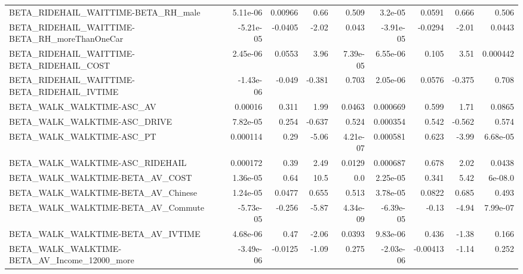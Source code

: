\begin{tabular}{lrrrrrrrr}
BETA\_RIDEHAIL\_WAITTIME-BETA\_RH\_male                &    5.11e-06 &      0.00966 &     0.66 &    0.509 &    3.2e-05 &      0.0591 &        0.666 &         0.506 \\
BETA\_RIDEHAIL\_WAITTIME-BETA\_RH\_moreThanOneCar      &   -5.21e-05 &      -0.0405 &    -2.02 &    0.043 &  -3.91e-05 &     -0.0294 &        -2.01 &        0.0443 \\
BETA\_RIDEHAIL\_WAITTIME-BETA\_RIDEHAIL\_COST          &    2.45e-06 &       0.0553 &     3.96 & 7.39e-05 &   6.55e-06 &       0.105 &         3.51 &      0.000442 \\
BETA\_RIDEHAIL\_WAITTIME-BETA\_RIDEHAIL\_IVTIME        &   -1.43e-06 &       -0.049 &   -0.381 &    0.703 &   2.05e-06 &      0.0576 &       -0.375 &         0.708 \\
BETA\_WALK\_WALKTIME-ASC\_AV                          &     0.00016 &        0.311 &     1.99 &   0.0463 &   0.000669 &       0.599 &         1.71 &        0.0865 \\
BETA\_WALK\_WALKTIME-ASC\_DRIVE                       &    7.82e-05 &        0.254 &   -0.637 &    0.524 &   0.000354 &       0.542 &       -0.562 &         0.574 \\
BETA\_WALK\_WALKTIME-ASC\_PT                          &    0.000114 &         0.29 &    -5.06 & 4.21e-07 &   0.000581 &       0.623 &        -3.99 &      6.68e-05 \\
BETA\_WALK\_WALKTIME-ASC\_RIDEHAIL                    &    0.000172 &         0.39 &     2.49 &   0.0129 &   0.000687 &       0.678 &         2.02 &        0.0438 \\
BETA\_WALK\_WALKTIME-BETA\_AV\_COST                    &    1.36e-05 &         0.64 &     10.5 &      0.0 &   2.25e-05 &       0.341 &         5.42 &       6e-08.0 \\
BETA\_WALK\_WALKTIME-BETA\_AV\_Chinese                 &    1.24e-05 &       0.0477 &    0.655 &    0.513 &   3.78e-05 &      0.0822 &        0.685 &         0.493 \\
BETA\_WALK\_WALKTIME-BETA\_AV\_Commute                 &   -5.73e-05 &       -0.256 &    -5.87 & 4.34e-09 &  -6.39e-05 &       -0.13 &        -4.94 &      7.99e-07 \\
BETA\_WALK\_WALKTIME-BETA\_AV\_IVTIME                  &    4.68e-06 &         0.47 &    -2.06 &   0.0393 &   9.83e-06 &       0.436 &        -1.38 &         0.166 \\
BETA\_WALK\_WALKTIME-BETA\_AV\_Income\_12000\_more       &   -3.49e-06 &      -0.0125 &    -1.09 &    0.275 &  -2.03e-06 &    -0.00413 &        -1.14 &         0.252 \\

\end{tabular}
